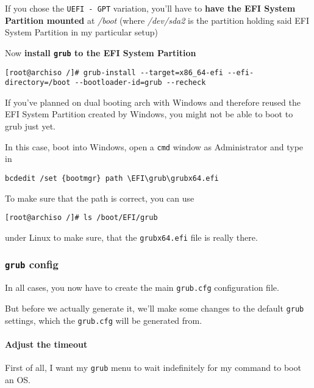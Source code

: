 \documentclass[10pt]{dustdoc}
\begin{document}
If you chose the \texttt{UEFI - GPT} variation, you’ll have to \textbf{have the EFI System Partition mounted} at \textit{/boot} (where \textit{/dev/sda2} is the partition holding said EFI System Partition in my particular setup)

Now \textbf{install \texttt{grub} to the EFI System Partition}

\begin{verbatim}
[root@archiso /]# grub-install --target=x86_64-efi --efi-directory=/boot --bootloader-id=grub --recheck
\end{verbatim}

\begin{IMPORTANT}
    If you’ve planned on dual booting arch with Windows and therefore reused the EFI System Partition created by Windows, you might not be able to boot to grub just yet.

    In this case, boot into Windows, open a \texttt{cmd} window as Administrator and type in

    \begin{verbatim}
bcdedit /set {bootmgr} path \EFI\grub\grubx64.efi
    \end{verbatim}

    To make sure that the path is correct, you can use

    \begin{verbatim}
[root@archiso /]# ls /boot/EFI/grub
    \end{verbatim}

    \noindent
    under Linux to make sure, that the \texttt{grubx64.efi} file is really there.
\end{IMPORTANT}

\subsubsection{\texttt{grub} config}
\label{sec:grub-config}

In all cases, you now have to create the main \texttt{grub.cfg} configuration file.

But before we actually generate it, we’ll make some changes to the default \texttt{grub} settings, which the \texttt{grub.cfg} will be generated from.

\paragraph{Adjust the timeout}
\label{par:adjust-the-timeout}

First of all, I want my \texttt{grub} menu to wait indefinitely for my command to boot an OS.
\end{document}
